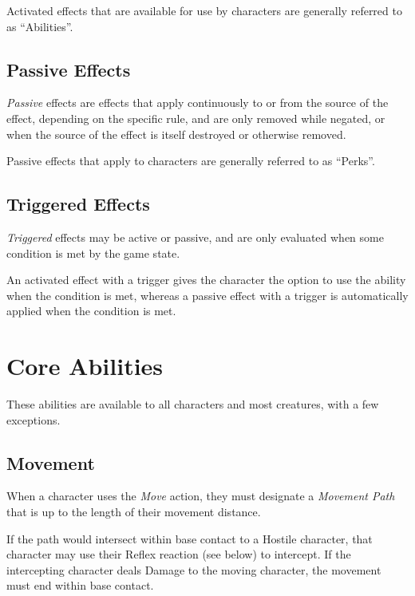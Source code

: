 Activated effects that are available for use by characters are generally referred to as ``Abilities''.

\subsection{Passive Effects}
\textit{Passive} effects are effects that apply continuously to or from the source of the effect,
depending on the specific rule, and are only removed while negated, 
or when the source of the effect is itself destroyed or otherwise removed.

\vspace{0.4em}

Passive effects that apply to characters are generally referred to as ``Perks''.

\subsection{Triggered Effects}
\textit{Triggered} effects may be active or passive, 
and are only evaluated when some condition is met by the game state.

An activated effect with a trigger gives the character the option to use the ability 
when the condition is met, whereas a passive effect with a trigger is automatically applied
when the condition is met.


\newpage

\section{Core Abilities}
These abilities are available to all characters and most creatures, with a few exceptions.


\subsection{Movement}
When a character uses the \textit{Move} action, 
they must designate a \textit{Movement Path} that is up to the length 
of their movement distance.

\vspace{0.4em}

If the path would intersect within base contact to a Hostile character, 
that character may use their Reflex reaction (see below) to intercept.
If the intercepting character deals Damage to the moving character, 
the movement must end within base contact.

\vspace{0.4em}

